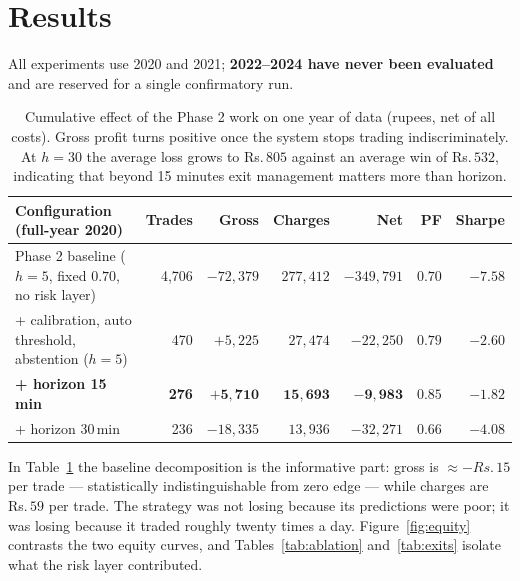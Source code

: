 \documentclass[10pt,a4paper]{article}
\newcommand{\rs}{Rs.\,}
\begin{document}
\section{Results}\label{sec:results}

All experiments use 2020 and 2021; \textbf{2022--2024 have never been
evaluated} and are reserved for a single confirmatory run.

\begin{table}[H]
\centering\small
\begin{tabular}{@{}lrrrrrr@{}}
\toprule
\textbf{Configuration (full-year 2020)} & \textbf{Trades} & \textbf{Gross} &
\textbf{Charges} & \textbf{Net} & \textbf{PF} & \textbf{Sharpe}\\
\midrule
Phase 2 baseline ($h=5$, fixed $0.70$, no risk layer)
  & 4{,}706 & $-72{,}379$ & $277{,}412$ & $-349{,}791$ & $0.70$ & $-7.58$\\
+ calibration, auto threshold, abstention ($h=5$)
  & 470 & $+5{,}225$ & $27{,}474$ & $-22{,}250$ & $0.79$ & $-2.60$\\
\textbf{+ horizon 15\,min}
  & \textbf{276} & $\mathbf{+5{,}710}$ & $\mathbf{15{,}693}$ &
  $\mathbf{-9{,}983}$ & $\mathbf{0.85}$ & $\mathbf{-1.82}$\\
+ horizon 30\,min
  & 236 & $-18{,}335$ & $13{,}936$ & $-32{,}271$ & $0.66$ & $-4.08$\\
\bottomrule
\end{tabular}
\caption{Cumulative effect of the Phase 2 work on one year of data (rupees,
net of all costs). Gross profit turns positive once the system stops trading
indiscriminately. At $h=30$ the average loss grows to \rs$805$ against an
average win of \rs$532$, indicating that beyond 15 minutes exit management
matters more than horizon.}
\label{tab:progress}
\end{table}

In Table~\ref{tab:progress} the baseline decomposition is the informative part:
gross is $\approx-\rs 15$ per trade --- statistically indistinguishable from
zero edge --- while charges are \rs$59$ per trade. The strategy was not losing
because its predictions were poor; it was losing because it traded roughly
twenty times a day. Figure~\ref{fig:equity} contrasts the two equity curves,
and Tables~\ref{tab:ablation} and~\ref{tab:exits} isolate what the risk layer
contributed.
\end{document}
